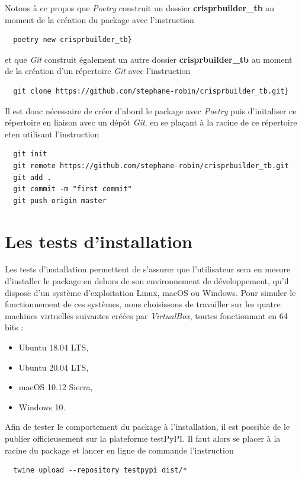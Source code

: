 \documentclass[twoside,a4paper,11pt,frenchb,openany]{report}
\begin{document}
Notons à ce propos que \textit{Poetry} construit un dossier \textbf{crisprbuilder\_tb} au moment de la création du package avec l'instruction

 \begin{verbatim}  poetry new crisprbuilder_tb}\end{verbatim}

et que \textit{Git} construit également un autre dossier \textbf{crisprbuilder\_tb} au moment de la création d'un répertoire \textit{Git} avec l'instruction

\begin{verbatim}  git clone https://github.com/stephane-robin/crisprbuilder_tb.git}\end{verbatim}

Il est donc nécessaire de créer d'abord le package avec \textit{Poetry} puis d'initaliser ce répertoire en liaison avec un dépôt \textit{Git}, en se plaçant à la racine de ce répertoire eten utilisant l'instruction

\begin{verbatim}
  git init
  git remote https://github.com/stephane-robin/crisprbuilder_tb.git
  git add .
  git commit -m "first commit"
  git push origin master
\end{verbatim} 




\section{Les tests d'installation}

Les tests d'installation permettent de s'assurer que l'utilisateur sera en mesure d'installer le package en dehors de son environnement de développement, qu'il dispose d'un système d'exploitation Linux, macOS ou Windows. Pour simuler le fonctionnement de ces systèmes, nous choisissons de travailler sur les quatre machines virtuelles suivantes créées par \textit{VirtualBox}, toutes fonctionnant en 64 bits : 
\begin{itemize}
\item Ubuntu 18.04 LTS, 
\item Ubuntu 20.04 LTS, 
\item macOS 10.12 Sierra, 
\item Windows 10.
\end{itemize}

Afin de tester le comportement du package à l'installation, il est possible de le publier officieusement sur la plateforme testPyPI. Il faut alors se placer à la racine du package et lancer en ligne de commande l'instruction
\begin{verbatim}  twine upload --repository testpypi dist/*\end{verbatim}
\end{document}
